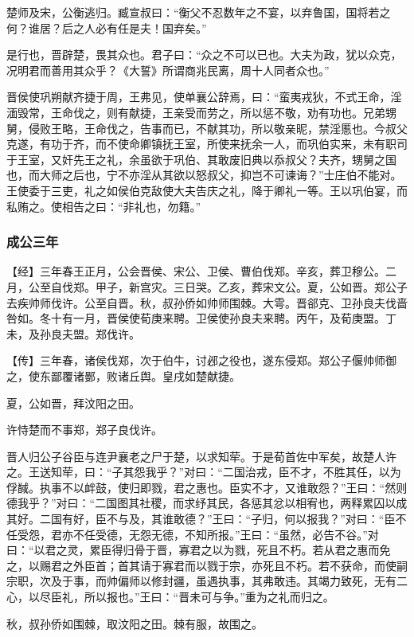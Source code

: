 \documentclass[]{article}
\begin{document}
楚师及宋，公衡逃归。臧宣叔曰：``衡父不忍数年之不宴，以弃鲁国，国将若之何？谁居？后之人必有任是夫！国弃矣。''

是行也，晋辟楚，畏其众也。君子曰：``众之不可以已也。大夫为政，犹以众克，况明君而善用其众乎？《大誓》所谓商兆民离，周十人同者众也。''

晋侯使巩朔献齐捷于周，王弗见，使单襄公辞焉，曰：``蛮夷戎狄，不式王命，淫湎毁常，王命伐之，则有献捷，王亲受而劳之，所以惩不敬，劝有功也。兄弟甥舅，侵败王略，王命伐之，告事而已，不献其功，所以敬亲昵，禁淫慝也。今叔父克遂，有功于齐，而不使命卿镇抚王室，所使来抚余一人，而巩伯实来，未有职司于王室，又奸先王之礼，余虽欲于巩伯、其敢废旧典以忝叔父？夫齐，甥舅之国也，而大师之后也，宁不亦淫从其欲以怒叔父，抑岂不可谏诲？''士庄伯不能对。王使委于三吏，礼之如侯伯克敌使大夫告庆之礼，降于卿礼一等。王以巩伯宴，而私贿之。使相告之曰：``非礼也，勿籍。''

\hypertarget{header-n1548}{%
\subsubsection{成公三年}\label{header-n1548}}

【经】三年春王正月，公会晋侯、宋公、卫侯、曹伯伐郑。辛亥，葬卫穆公。二月，公至自伐郑。甲子，新宫灾。三日哭。乙亥，葬宋文公。夏，公如晋。郑公子去疾帅师伐许。公至自晋。秋，叔孙侨如帅师围棘。大雩。晋郤克、卫孙良夫伐啬咎如。冬十有一月，晋侯使荀庚来聘。卫侯使孙良夫来聘。丙午，及荀庚盟。丁未，及孙良夫盟。郑伐许。

【传】三年春，诸侯伐郑，次于伯牛，讨邲之役也，遂东侵郑。郑公子偃帅师御之，使东鄙覆诸鄤，败诸丘舆。皇戌如楚献捷。

夏，公如晋，拜汶阳之田。

许恃楚而不事郑，郑子良伐许。

晋人归公子谷臣与连尹襄老之尸于楚，以求知荦。于是荀首佐中军矣，故楚人许之。王送知荦，曰：``子其怨我乎？''对曰：``二国治戎，臣不才，不胜其任，以为俘馘。执事不以衅鼓，使归即戮，君之惠也。臣实不才，又谁敢怨？''王曰：``然则德我乎？''对曰：``二国图其社稷，而求纾其民，各惩其忿以相宥也，两释累囚以成其好。二国有好，臣不与及，其谁敢德？''王曰：``子归，何以报我？''对曰：``臣不任受怨，君亦不任受德，无怨无德，不知所报。''王曰：``虽然，必告不谷。''对曰：``以君之灵，累臣得归骨于晋，寡君之以为戮，死且不朽。若从君之惠而免之，以赐君之外臣首；首其请于寡君而以戮于宗，亦死且不朽。若不获命，而使嗣宗职，次及于事，而帅偏师以修封疆，虽遇执事，其弗敢违。其竭力致死，无有二心，以尽臣礼，所以报也。''王曰：``晋未可与争。''重为之礼而归之。

秋，叔孙侨如围棘，取汶阳之田。棘有服，故围之。
\end{document}
